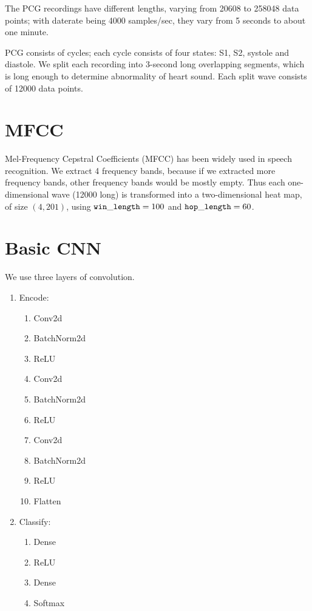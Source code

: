 \documentclass[twocolumn]{cinc}
\begin{document}
The PCG recordings have different lengths, varying from 20608 to 258048 data points; with daterate being 4000 samples/sec, they vary from 5 seconds to about one minute.

PCG consists of cycles; each cycle consists of four states: S1, S2, systole and diastole. 
We split each recording into 3-second long overlapping segments, which is long enough to determine abnormality of heart sound.
Each split wave consists of 12000 data points.

\section{MFCC}

Mel-Frequency Cepstral Coefficients (MFCC) \cite{mfcc} has been widely used in speech recognition. We extract 4 frequency bands, because if we extracted more frequency bands, other frequency bands would be mostly empty. Thus each one-dimensional wave (12000 long) is transformed into a two-dimensional heat map, of size $(4, 201)$, using ${\tt win\_length}=100$ and ${\tt hop\_length}=60$. 

\section{Basic CNN}

We use three layers of convolution.
\begin{enumerate}
\item Encode:
\begin{enumerate}
\item Conv2d
\item BatchNorm2d
\item ReLU
\item Conv2d
\item BatchNorm2d
\item ReLU
\item Conv2d
\item BatchNorm2d
\item ReLU
\item Flatten
\end{enumerate}
\item Classify:
\begin{enumerate}
\item Dense
\item ReLU
\item Dense
\item Softmax
\end{enumerate}
\end{enumerate}
\end{document}
